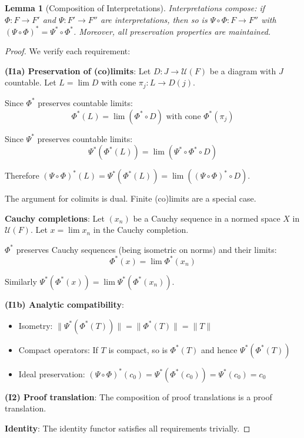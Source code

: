\documentclass[11pt]{article}
\newtheorem{lemma}[theorem]{Lemma}
\theoremstyle{definition}
\theoremstyle{remark}
\newcommand{\cnull}{c_0}
\begin{document}
\begin{lemma}[Composition of Interpretations]\label{lem:composition}
Interpretations compose: if \(\Phi:F\to F'\) and \(\Psi:F'\to F''\) are interpretations, then so is \(\Psi\circ\Phi:F\to F''\) with \((\Psi\circ\Phi)^*=\Psi^*\circ\Phi^*\). Moreover, all preservation properties are maintained.
\end{lemma}

\begin{proof}
We verify each requirement:

\textbf{(I1a) Preservation of (co)limits}: 
Let \(D: J \to \mathcal{U}(F)\) be a diagram with \(J\) countable. Let \(L = \lim D\) with cone \(\pi_j: L \to D(j)\).

Since \(\Phi^*\) preserves countable limits:
\[\Phi^*(L) = \lim(\Phi^* \circ D) \text{ with cone } \Phi^*(\pi_j)\]

Since \(\Psi^*\) preserves countable limits:
\[\Psi^*(\Phi^*(L)) = \lim(\Psi^* \circ \Phi^* \circ D)\]

Therefore \((\Psi \circ \Phi)^*(L) = \Psi^*(\Phi^*(L)) = \lim((\Psi \circ \Phi)^* \circ D)\).

The argument for colimits is dual. Finite (co)limits are a special case.

\textbf{Cauchy completions}: Let \((x_n)\) be a Cauchy sequence in a normed space \(X\) in \(\mathcal{U}(F)\). Let \(x = \lim x_n\) in the Cauchy completion.

\(\Phi^*\) preserves Cauchy sequences (being isometric on norms) and their limits:
\[\Phi^*(x) = \lim \Phi^*(x_n)\]

Similarly \(\Psi^*(\Phi^*(x)) = \lim \Psi^*(\Phi^*(x_n))\).

\textbf{(I1b) Analytic compatibility}:
\begin{itemize}
\item Isometry: \(\|\Psi^*(\Phi^*(T))\| = \|\Phi^*(T)\| = \|T\|\)
\item Compact operators: If \(T\) is compact, so is \(\Phi^*(T)\) and hence \(\Psi^*(\Phi^*(T))\)
\item Ideal preservation: \((\Psi \circ \Phi)^*(\cnull) = \Psi^*(\Phi^*(\cnull)) = \Psi^*(\cnull) = \cnull\)
\end{itemize}

\textbf{(I2) Proof translation}: The composition of proof translations is a proof translation.

\textbf{Identity}: The identity functor satisfies all requirements trivially.
\end{proof}
\end{document}

